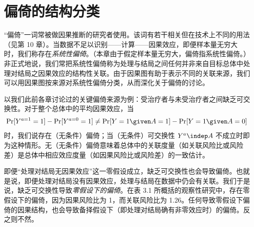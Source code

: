 \begin{finepoint}[因果结构的发现]
\begin{center}
\label{fig:6.11}
\end{center}
\end{finepoint}

\section{偏倚的结构分类}

“偏倚”一词常被做因果推断的研究者使用。该词有若干相关但在技术上不同的用法（见第 10 章）。当数据不足以识别——计算——因果效应，即便样本量无穷大时，我们称存在\emph{系统性偏倚}。（本章由于假定样本量无穷大，偏倚指系统性偏倚。）非正式地说，我们常把系统性偏倚称为处理与结局之间任何并非来自目标总体中处理对结局之因果效应的结构性关联。由于因果图有助于表示不同的关联来源，我们可以用因果图按来源对系统性偏倚分类，从而深化关于偏倚的讨论。


以我们此前各章讨论过的关键偏倚来源为例：受治疗者与未受治疗者之间缺乏可交换性。对于整个总体中的平均因果效应，当
\[
\Pr[Y^{a=1}=1]-\Pr[Y^{a=0}=1]\neq \Pr[Y=1\given A=1]-\Pr[Y=1\given A=0]
\]
时，我们说存在（无条件）偏倚；当（无条件）可交换性 $Y^{a}\indep A$ 不成立时即为这种情形。无（无条件）偏倚意味着总体中的关联度量（如关联风险比或风险差）是总体中相应效应度量（如因果风险比或风险差）的一致估计。

即便“处理对结局无因果效应”这一零假设成立，缺乏可交换性也会导致偏倚。也就是说，即便处理对结局没有因果效应，处理与结局在数据中仍会有关联。我们于是说，缺乏可交换性导致\emph{零假设下的偏倚}。在表 3.1 所概括的观察性研究中，存在零假设下的偏倚，因为因果风险比为 1，而关联风险比为 1.26。任何导致零假设下偏倚的因果结构，也会导致备择假设下（即处理对结局确有非零效应时）的偏倚。反之则不然。

